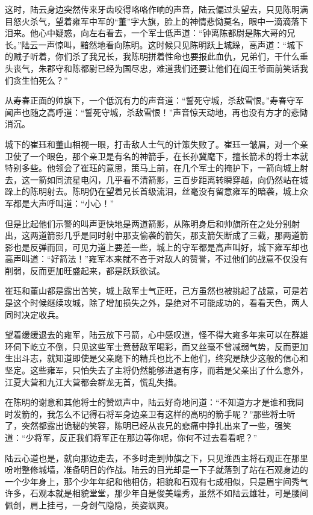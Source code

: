 这时，陆云身边突然传来牙齿咬得咯咯作响的声音，陆云偏过头望去，只见陈明满目怒火杀气，望着雍军中军的“董”字大旗，脸上的神情悲恸莫名，眼中一滴滴落下泪来。他心中疑惑，向左右看去，一个军士低声道：“钟离陈都尉是陈大哥的兄长。”陆云一声惊叫，黯然地看向陈明。这时候只见陈明跃上城跺，高声道：“城下的贼子听着，你们杀了我兄长，我陈明拼着性命也要报此血仇，兄弟们，干什么垂头丧气，朱郡守和陈都尉已经为国尽忠，难道我们还要让他们在阎王爷面前笑话我们贪生怕死么？”

从寿春正面的帅旗下，一个低沉有力的声音道：“誓死守城，杀敌雪恨。”寿春守军闻声也随之高呼道：“誓死守城，杀敌雪恨！”声音惊天动地，再也没有方才的悲恸消沉。

城下的崔珏和董山相视一眼，打击敌人士气的计策失败了。崔珏一皱眉，对一个亲卫使了一个眼色，那个亲卫是有名的神箭手，在长孙冀麾下，擅长箭术的将士本就特别多些。他领会了崔珏的意思，策马上前，在几个军士的掩护下，一箭向城上射去，这一箭如同流星电闪，几乎看不清箭影，三百步距离转瞬穿越，向仍然站在城跺上的陈明射去。陈明仍在望着兄长首级流泪，丝毫没有留意雍军的暗袭，城上众军都是大声呼叫道：“小心！”

但是比起他们示警的叫声更快地是两道箭影，从陈明身后和帅旗所在之处分别射出，这两道箭影几乎是同时射中那支偷袭的箭矢，那支箭矢断成了三截，那两道箭影也是反弹而回，可见力道上要差一些，城上的守军都是高声叫好，城下雍军却也高声叫道：“好箭法！”雍军本来就不吝于对敌人的赞誉，不过他们的战意不仅没有削弱，反而更加旺盛起来，都是跃跃欲试。

崔珏和董山都是露出苦笑，城上敌军士气正旺，己方虽然也被挑起了战意，可是若是这个时候继续攻城，除了增加损失之外，是绝对不可能成功的，看看天色，两人同时决定收兵。

望着缓缓退去的雍军，陆云放下弓箭，心中感叹道，怪不得大雍多年来可以在群雄环伺下屹立不倒，只见这些军士竟替敌军喝彩，而又丝毫不曾减弱气势，反而更加生出斗志，就知道即使是父亲麾下的精兵也比不上他们，终究是缺少这般的信心和坚定。这些雍军，只怕失去了主将仍然能够进退有序，而若是父亲出了什么意外，江夏大营和九江大营都会群龙无首，慌乱失措。

在陈明的谢意和其他将士的赞颂声中，陆云好奇地问道：“不知道方才是谁和我同时发箭的，我怎么不记得石将军身边亲卫有这样的高明的箭手呢？”那些将士听了，突然都露出诡秘的笑容，陈明已经从丧兄的悲痛中挣扎出来了一些，强笑道：“少将军，反正我们将军正在那边等你呢，你何不过去看看呢？”

陆云心道也是，就向那边走去，不多时走到帅旗之下，只见淮西主将石观正在那里吩咐整修城墙，准备明日的作战。陆云的目光却是一下子就落到了站在石观身边的一个少年身上，那个少年年纪和他相仿，相貌和石观有七成相似，只是眉宇间秀气许多，石观本就是相貌堂堂，那少年自是俊美端秀，虽然不如陆云雄壮，可是腰间佩剑，肩上挂弓，一身剑气隐隐，英姿飒爽。

